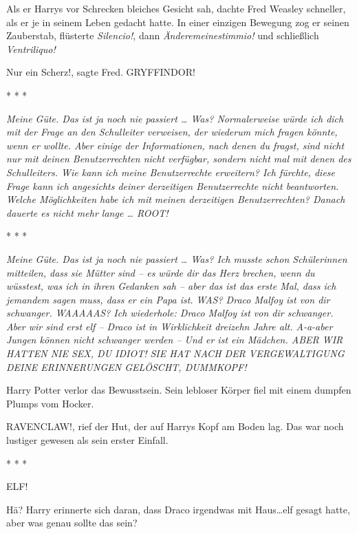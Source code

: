 Als er Harrys vor Schrecken bleiches Gesicht sah, dachte Fred Weasley schneller,
als er je in seinem Leben gedacht hatte. In einer einzigen Bewegung zog er
seinen Zauberstab, flüsterte \emph{\glqq{}Silencio!\grqq{}}, dann \emph{\glqq{}
Änderemeinestimmio!\grqq{}} und schließlich \emph{\glqq{}Ventriliquo!\grqq{}}

\glqq{}Nur ein Scherz!\grqq{}, sagte Fred. \glqq{}GRYFFINDOR!\grqq{}

* * *

\emph{\glqq{}Meine Güte. Das ist ja noch nie passiert …\grqq{}
Was? \glqq{}Normalerweise würde ich dich mit der Frage an den Schulleiter
verweisen, der wiederum mich fragen könnte, wenn er wollte. Aber einige der
Informationen, nach denen du fragst, sind nicht nur mit deinen Benutzerrechten
nicht verfügbar, sondern nicht mal mit denen des Schulleiters.\grqq{} Wie kann
ich meine Benutzerrechte erweitern? \glqq{}Ich fürchte, diese Frage kann ich
angesichts deiner derzeitigen Benutzerrechte nicht beantworten.\grqq{} Welche
Möglichkeiten habe \emph{ich mit meinen derzeitigen Benutzerrechten?} Danach
dauerte es nicht mehr lange … \glqq{}ROOT!\grqq{}}

* * *

\emph{\glqq{}Meine Güte. Das ist ja noch nie passiert …\grqq{}
Was? \glqq{}Ich musste schon Schülerinnen mitteilen, dass sie Mütter sind – es
würde dir das Herz brechen, wenn du wüsstest, was ich in ihren Gedanken sah –
aber das ist das erste Mal, dass ich jemandem sagen muss, dass er ein Papa
ist.\grqq{} WAS? \glqq{}Draco Malfoy ist von dir schwanger.\grqq{} WAAAAAS? \glqq{}
Ich wiederhole: Draco Malfoy ist von dir schwanger.\grqq{} Aber wir sind erst
elf – \glqq{}Draco ist in Wirklichkeit dreizehn Jahre alt.\grqq{} A-a-aber Jungen
können nicht schwanger werden – \glqq{}Und er ist ein Mädchen.\grqq{} ABER WIR
HATTEN NIE SEX, DU IDIOT! \glqq{}SIE HAT NACH DER VERGEWALTIGUNG DEINE
ERINNERUNGEN GELÖSCHT, DUMMKOPF!\grqq{}}

Harry Potter verlor das Bewusstsein. Sein lebloser Körper fiel mit einem dumpfen
Plumps vom Hocker.

\glqq{}RAVENCLAW!\grqq{}, rief der Hut, der auf Harrys Kopf am Boden lag. Das war
noch lustiger gewesen als sein erster Einfall.

* * *

\glqq{}ELF!\grqq{}

Hä? Harry erinnerte sich daran, dass Draco irgendwas mit \glqq{}Haus…elf\grqq{}
gesagt hatte, aber was genau sollte das sein?

